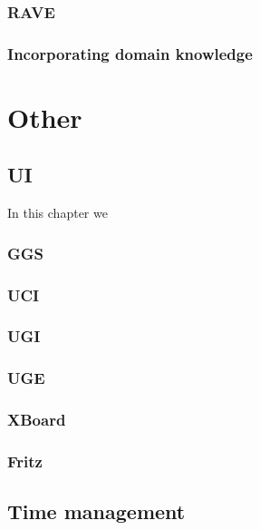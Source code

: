 \documentclass[10pt,dvipdfmx,letterpaper]{report}
\begin{document}
\section{RAVE}

\section{Incorporating domain knowledge}



\part{Other}

\chapter{UI}
\label{chap-ui}

In this chapter we 

\section{GGS}
\section{UCI}
\section{UGI}
\section{UGE}
\section{XBoard}
\section{Fritz}

\chapter{Time management}
\label{chap-time}
\end{document}

